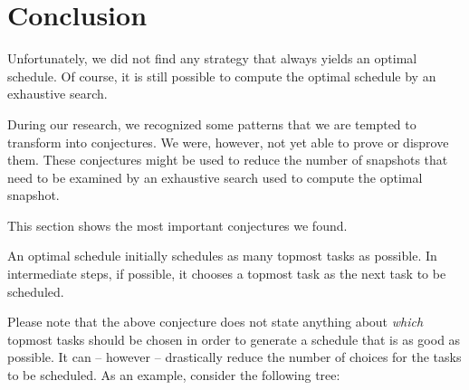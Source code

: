 \section{Conclusion}
\label{sec:p3-conclusion}

Unfortunately, we did not find any strategy that always yields an optimal schedule. Of course, it is still possible to compute the optimal schedule by an exhaustive search.

During our research, we recognized some patterns that we are tempted to transform into conjectures. We were, however, not yet able to prove or disprove them. These conjectures might be used to reduce the number of snapshots that need to be examined by an exhaustive search used to compute the optimal snapshot.

This section shows the most important conjectures we found.

\begin{conjecture}
  \label{conj:as-many-topmost-as-possibly}
  An optimal schedule initially schedules as many topmost tasks as possible. 
  In intermediate steps, if possible, it chooses a topmost task as the next task to be scheduled.
\end{conjecture}

Please note that the above conjecture does not state anything about \emph{which} topmost tasks should be chosen in order to generate a schedule that is as good as possible. It can -- however -- drastically reduce the number of choices for the tasks to be scheduled. As an example, consider the following tree:

